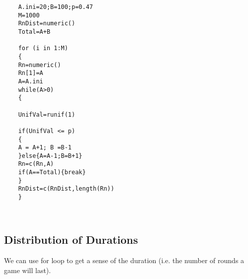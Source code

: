\documentclass[a4paper,12pt]{article}
\begin{document}
\begin{framed}
	\begin{verbatim}
	A.ini=20;B=100;p=0.47
	M=1000
	RnDist=numeric()
	Total=A+B
	
	for (i in 1:M)
	{
	Rn=numeric()
	Rn[1]=A
	A=A.ini
	while(A>0)
	{
	
	UnifVal=runif(1)
	
	if(UnifVal <= p)
	{
	A = A+1; B =B-1
	}else{A=A-1;B=B+1}
	Rn=c(Rn,A)
	if(A==Total){break}
	}
	RnDist=c(RnDist,length(Rn))
	}
	
	
	\end{verbatim}
\end{framed}
\subsection{Distribution of Durations}
We can use for loop to get a sense of the duration (i.e. the number of rounds a game will last).
\end{document}
